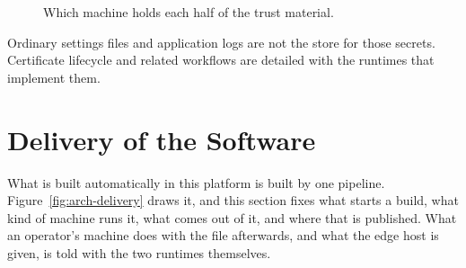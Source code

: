 \documentclass[12pt,a4paper]{report}
\begin{document}
\begin{figure}[htbp]
{%
}
\caption{Which machine holds each half of the trust material.}
\label{fig:arch-secrets}
\end{figure}

Ordinary settings files and application logs are not the
store for those secrets. Certificate lifecycle and
related workflows are detailed with the runtimes that
implement them.

\section{Delivery of the Software}
\label{sec:arch-delivery}

What is built automatically in this platform is built by one
pipeline. Figure~\ref{fig:arch-delivery} draws it, and this section
fixes what starts a build, what kind of machine runs it, what comes
out of it, and where that is published. What an operator's machine
does with the file afterwards, and what the edge host is given, is
told with the two runtimes themselves.
\end{document}
